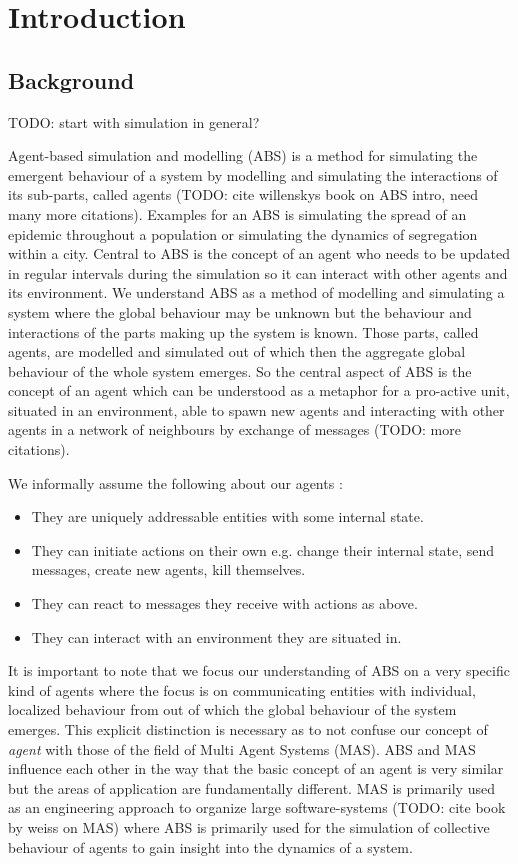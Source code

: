\chapter{Introduction}
\label{chap:intro}

\section{Background}
TODO: start with simulation in general?

Agent-based simulation and modelling (ABS) is a method for simulating the emergent behaviour of a system by modelling and simulating the interactions of its sub-parts, called agents (TODO: cite willenskys book on ABS intro, need many more citations). Examples for an ABS is simulating the spread of an epidemic throughout a population or simulating the dynamics of segregation within a city. Central to ABS is the concept of an agent who needs to be updated in regular intervals during the simulation so it can interact with other agents and its environment.
We understand ABS as a method of modelling and simulating a system where the global behaviour may be unknown but the behaviour and interactions of the parts making up the system is known. Those parts, called agents, are modelled and simulated out of which then the aggregate global behaviour of the whole system emerges. So the central aspect of ABS is the concept of an agent which can be understood as a metaphor for a pro-active unit, situated in an environment, able to spawn new agents and interacting with other agents in a network of neighbours by exchange of messages \cite{wooldridge_introduction_2009} (TODO: more citations). 

We informally assume the following about our agents \cite{wooldridge_introduction_2009}:

\begin{itemize}
	\item They are uniquely addressable entities with some internal state.
	\item They can initiate actions on their own e.g. change their internal state, send messages, create new agents, kill themselves.
	\item They can react to messages they receive with actions as above.
	\item They can interact with an environment they are situated in.
\end{itemize} 

It is important to note that we focus our understanding of ABS on a very specific kind of agents where the focus is on communicating entities with individual, localized behaviour from out of which the global behaviour of the system emerges. This explicit distinction is necessary as to not confuse our concept of \textit{agent} with those of the field of Multi Agent Systems (MAS). ABS and MAS influence each other in the way that the basic concept of an agent is very similar but the areas of application are fundamentally different. MAS is primarily used as an engineering approach to organize large software-systems (TODO: cite book by weiss on MAS) where ABS is primarily used for the simulation of collective behaviour of agents to gain insight into the dynamics of a system.


